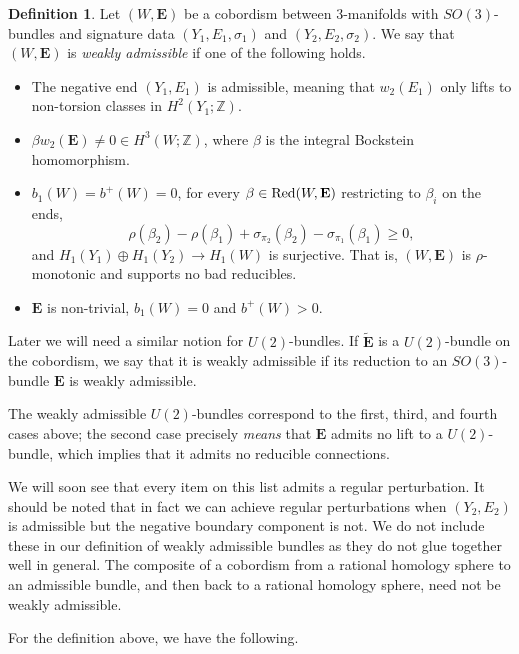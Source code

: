 \documentclass{memo-l}
\theoremstyle{definition}
\newtheorem{definition}[theorem]{Definition}
\theoremstyle{remark}
\numberwithin{section}{chapter}
\numberwithin{equation}{chapter}
\begin{document}
\begin{definition}\label{admiss-cob}Let $(W, \mathbf{E})$ be a cobordism between 3-manifolds with $SO(3)$-bundles and signature data $(Y_1, E_1, \sigma_1)$ and $(Y_2, E_2, \sigma_2)$. We say that $(W,\mathbf{E})$ is \textit{weakly admissible} if one of the following holds.
\begin{itemize}
    \item The negative end $(Y_1, E_1)$ is admissible, meaning that $w_2(E_1)$ only lifts to non-torsion classes in $H^2(Y_1;\mathbb Z)$.
    \item $\beta w_2(\mathbf{E}) \neq 0 \in H^3(W;\mathbb Z)$, where $\beta$ is the integral Bockstein homomorphism. 
    \item $b_1(W) = b^+(W) = 0$, for every $\beta \in \textup{Red}(W, \mathbf E)$ restricting to $\beta_i$ on the ends, $$\rho(\beta_2) - \rho(\beta_1) + \sigma_{\pi_2}(\beta_2) - \sigma_{\pi_1}(\beta_1) \geq 0,$$ and $H_1(Y_1) \oplus H_1(Y_2) \to H_1(W)$ is surjective. That is, $(W,\mathbf{E})$ is $\rho$-monotonic and supports no bad reducibles. 
    \item $\mathbf{E}$ is non-trivial, $b_1(W) = 0$ and $b^+(W) > 0$. 
\end{itemize}
Later we will need a similar notion for $U(2)$-bundles. If $\widetilde{\mathbf{E}}$ is a $U(2)$-bundle on the cobordism, we say that it is weakly admissible if its reduction to an $SO(3)$-bundle $\mathbf{E}$ is weakly admissible. 
\end{definition}

The weakly admissible $U(2)$-bundles correspond to the first, third, and fourth cases above; the second case precisely \textit{means} that $\mathbf{E}$ admits no lift to a $U(2)$-bundle, which implies that it admits no reducible connections.

We will soon see that every item on this list admits a regular perturbation. It should be noted that in fact we can achieve regular perturbations when $(Y_2, E_2)$ is admissible but the negative boundary component is not. We do not include these in our definition of weakly admissible bundles as they do not glue together well in general. The composite of a cobordism from a rational homology sphere to an admissible bundle, and then back to a rational homology sphere, need not be weakly admissible.

For the definition above, we have the following.
\end{document}
